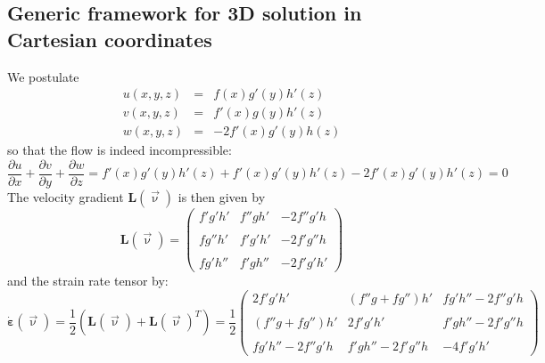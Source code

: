 \subsection{Generic framework for 3D solution in Cartesian coordinates}\label{ss:mms3Dgen}

We postulate
\begin{eqnarray}
u(x,y,z) &=& f(x) g'(y) h'(z) \\
v(x,y,z) &=& f'(x) g(y) h'(z) \\
w(x,y,z) &=& -2f'(x) g'(y) h(z) 
\end{eqnarray}
so that the flow is indeed incompressible: 
\[
\frac{\partial u}{\partial x}+
\frac{\partial v}{\partial y}+
\frac{\partial w}{\partial z}
=
f'(x) g'(y) h'(z) + f'(x) g'(y) h'(z) -2f'(x) g'(y) h'(z)
=0
\]
The velocity gradient ${\bm L}(\vec\upnu)$ is then given by
\[
{\bm L}(\vec\upnu) =
\left(
\begin{array}{ccc}
f'g'h' &  f'' g h' & -2f'' g' h \\ \\
fg''h' & f'g'h'    & -2f' g'' h \\ \\
fg'h'' & f'gh''    & -2f'g'h'
\end{array}
\right)
\]
and the strain rate tensor by:
\[
\dot{\bm \varepsilon}(\vec\upnu)
=\frac{1}{2}({\bm L}(\vec\upnu)+{\bm L}(\vec\upnu)^T)
=
\frac{1}{2}
\left(
\begin{array}{ccc}
2f'g'h' & (f'' g+fg'') h'  & fg'h''-2f'' g' h \\ \\
(f''g+fg'')h' & 2f'g'h'    & f'gh''-2f' g'' h \\ \\
fg'h'' -2f'' g' h & f'gh'' -2f' g'' h    & -4f'g'h'
\end{array}
\right)
\]


